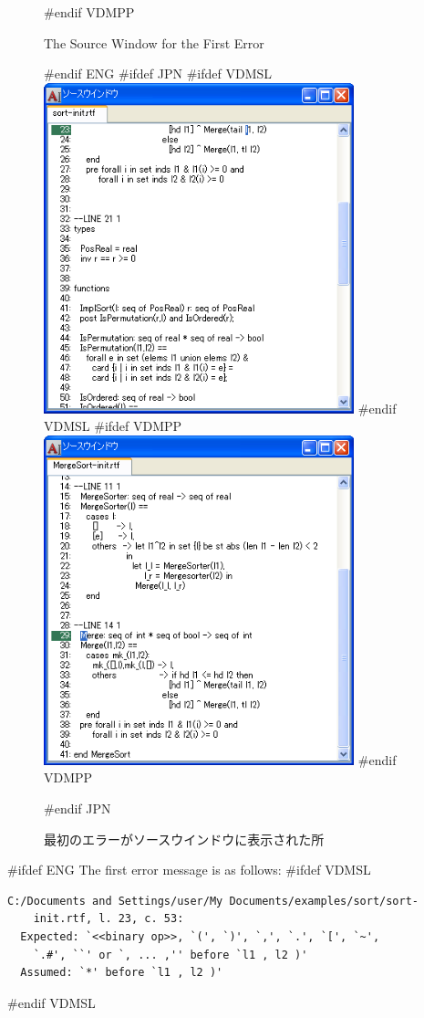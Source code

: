 \documentclass[\pformat,12pt]{article}
\begin{document}
\begin{figure}[tbh]
\begin{center}
#endif VDMPP
\caption{The Source Window for the First Error}
#endif ENG
#ifdef JPN
#ifdef VDMSL
\includegraphics[width=9cm]{sourceWindow-sl.png}
#endif VDMSL
#ifdef VDMPP
\includegraphics[width=9cm]{sourceWindow-pp.png}
#endif VDMPP
\caption{最初のエラーがソースウインドウに表示された所}
#endif JPN
\label{fig:source1}
\end{center}
\end{figure}

\newpage

#ifdef ENG
The first error message is as follows:
#ifdef VDMSL
\begin{verbatim}
C:/Documents and Settings/user/My Documents/examples/sort/sort-
    init.rtf, l. 23, c. 53:
  Expected: `<<binary op>>, `(', `)', `,', `.', `[', `~',
    `.#', ``' or `, ... ,'' before `l1 , l2 )'
  Assumed: `*' before `l1 , l2 )'
\end{verbatim}
#endif VDMSL
\end{document}
